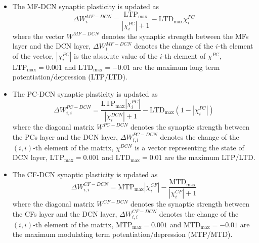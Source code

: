 \documentclass[journal,twoside,web]{ieeecolor}
\begin{document}
\begin{itemize}
\item The MF-DCN synaptic plasticity is updated as
\begin{equation}
\Delta W_{i}^{MF-DCN} = \frac{\text{LTP}_{\max}}{|\chi_i^{PC}|+1} - \text{LTD}_{\max} \chi^{PC}_i
\label{eq:W MF-DCN}
\end{equation}
where the vector $W^{MF-DCN}$ denotes the synaptic strength between the MFs layer and the DCN layer, $\Delta W_{i}^{MF-DCN}$ denotes the change of the $i$-th element of the vector, $|\chi^{PC}_i|$ is the absolute value of the $i$-th element of $\chi^{PC}$, $\text{LTP}_{\max} = 0.001$ and $\text{LTD}_{\max}=-0.01$ are the maximum long term potentiation/depression (LTP/LTD).
\item The PC-DCN synaptic plasticity is updated as
\begin{equation}
\Delta W_{i,i}^{PC-DCN} = \frac{\text{LTP}_{\max}|\chi_i^{PC}|}{|\chi_i^{DCN}|+1} - \text{LTD}_{\max} (1-|\chi^{PC}_i|)
\label{eq:W PC-DCN}
\end{equation}
where the diagonal matrix $W^{PC-DCN}$ denotes the synaptic strength between the PCs layer and the DCN layer, $\Delta W_{i,i}^{PC-DCN}$ denotes the change of the $(i,i)$-th element of the matrix, $\chi^{DCN}$ is a vector representing the state of DCN layer, $\text{LTP}_{\max} = 0.001$ and $\text{LTD}_{\max}=0.01$ are the maximum LTP/LTD.
\item The CF-DCN synaptic plasticity is updated as
\begin{equation}
\Delta W_{i,i}^{CF-DCN} = \text{MTP}_{\max} |\chi^{CF}_i|- \frac{\text{MTD}_{\max}}{|\chi_i^{CF}|+1}
\label{eq:W CF-DCN}
\end{equation}
where the diagonal matrix $W^{CF-DCN}$ denotes the synaptic strength between the CFs layer and the DCN layer, $\Delta W_{i,i}^{CF-DCN}$ denotes the change of the $(i,i)$-th element of the matrix, $\text{MTP}_{\max}=0.001$ and $\text{MTD}_{\max}=-0.01$ are the maximum modulating term potentiation/depression (MTP/MTD).
\end{itemize}
\end{document}
